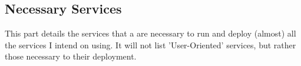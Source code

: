 \subsection{Necessary Services}
This part details the services that a are necessary to run and deploy (almost) all the services I intend on using.
It will not list 'User-Oriented' services, but rather those necessary to their deployment. 

